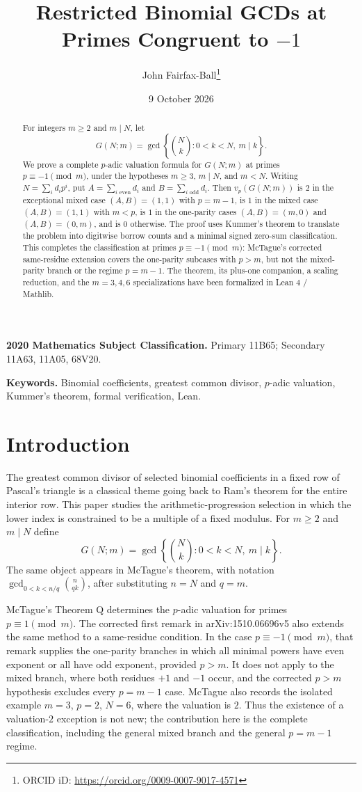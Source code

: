 \documentclass[11pt]{article}
\title{Restricted Binomial GCDs at Primes Congruent to \texorpdfstring{$-1$}{-1}}
\author{John Fairfax-Ball\thanks{ORCID iD: \url{https://orcid.org/0009-0007-9017-4571}}}
\date{9 October 2026}
\newcommand{\G}{G}
\begin{document}
\maketitle

\begin{abstract}
For integers $m\geq 2$ and $m\mid N$, let
\[
  G(N;m)=\gcd\left\{\binom Nk:0<k<N,\ m\mid k\right\}.
\]
We prove a complete $p$-adic valuation formula for $G(N;m)$ at primes
$p\equiv -1\pmod m$, under the hypotheses $m\geq 3$, $m\mid N$, and
$m<N$.  Writing $N=\sum_i d_i p^i$, put
$A=\sum_{i\text{ even}}d_i$ and $B=\sum_{i\text{ odd}}d_i$.
Then $v_p(G(N;m))$ is $2$ in the exceptional mixed case
$(A,B)=(1,1)$ with $p=m-1$, is $1$ in the mixed case
$(A,B)=(1,1)$ with $m<p$, is $1$ in the one-parity cases
$(A,B)=(m,0)$ and $(A,B)=(0,m)$, and is $0$ otherwise.
The proof uses Kummer's theorem to translate the problem into digitwise
borrow counts and a minimal signed zero-sum classification.  This completes
the classification at primes $p\equiv -1\pmod m$: McTague's corrected
same-residue extension covers the one-parity subcases with $p>m$, but not the
mixed-parity branch or the regime $p=m-1$.  The theorem, its plus-one
companion, a scaling reduction, and the $m=3,4,6$ specializations have been
formalized in Lean 4 / Mathlib.
\end{abstract}

\medskip
\noindent\textbf{2020 Mathematics Subject Classification.} Primary 11B65;
Secondary 11A63, 11A05, 68V20.

\noindent\textbf{Keywords.} Binomial coefficients, greatest common divisor,
$p$-adic valuation, Kummer's theorem, formal verification, Lean.

\section{Introduction}

The greatest common divisor of selected binomial coefficients in a fixed row
of Pascal's triangle is a classical theme going back to Ram's theorem for the
entire interior row.  This paper studies the arithmetic-progression selection
in which the lower index is constrained to be a multiple of a fixed modulus.
For $m\geq 2$ and $m\mid N$ define
\[
  \G(N;m)=\gcd\left\{\binom Nk:0<k<N,\ m\mid k\right\}.
\]
The same object appears in McTague's theorem, with notation
$\gcd_{0<k<n/q}\binom n{qk}$, after substituting $n=N$ and $q=m$.

McTague's Theorem Q determines the $p$-adic valuation for primes
$p\equiv 1\pmod m$.  The corrected first remark in arXiv:1510.06696v5 also
extends the same method to a same-residue condition.  In the case
$p\equiv -1\pmod m$, that remark supplies the one-parity branches in which all
minimal powers have even exponent or all have odd exponent, provided $p>m$.
It does not apply to the mixed branch, where both residues $+1$ and $-1$ occur,
and the corrected $p>m$ hypothesis excludes every $p=m-1$ case.  McTague also
records the isolated example $m=3$, $p=2$, $N=6$, where the valuation is $2$.
Thus the existence of a valuation-$2$ exception is not new; the contribution
here is the complete classification, including the general mixed branch and the
general $p=m-1$ regime.
\end{document}
